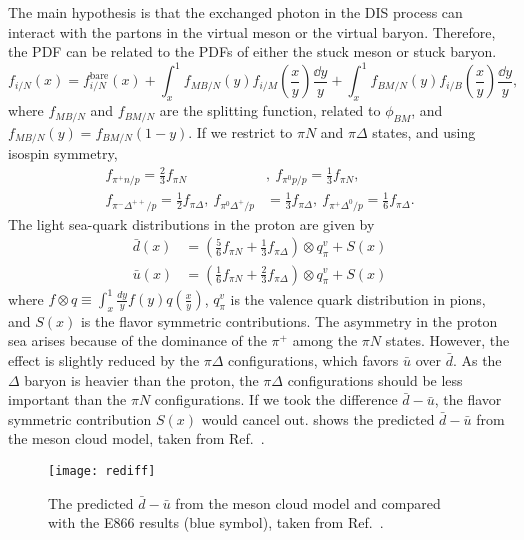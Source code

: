 \documentclass[../main.tex]{subfiles}
\begin{document}
The main hypothesis is that the exchanged photon in the DIS process can interact with the partons in the
virtual meson or the virtual
baryon. Therefore, the PDF can be related to the PDFs of either the stuck meson or stuck baryon.
\begin{equation}
	f_{i/N}\left(x\right) = f_{i/N}^{\mathrm{bare}}\left(x\right) +  \int^1_x f_{MB/N}\left(y\right) f_{i/M}\left(\frac{x}{y}\right) \frac{\dd{y}}{y} + \int^1_x f_{BM/N}\left(y\right) f_{i/B}\left(\frac{x}{y}\right) \frac{\dd{y}}{y},
\end{equation}
where $f_{MB/N}$ and $f_{BM/N}$ are the splitting function, related to $\phi_{BM}$, and $f_{MB/N}(y)=f_{BM/N}(1-y)$.
If we restrict to $\pi N$ and $\pi\Delta$ states, and using isospin symmetry,
\begin{align}
	f_{\pi^+n/p}=\frac{2}{3} f_{\pi N}                                       & , ~f_{\pi^0 p/p}=\frac{1}{3} f_{\pi N},                                         \\
	f_{\pi^-\Delta^{++}/p}=\frac{1}{2} f_{\pi \Delta}, ~f_{\pi^0 \Delta^+/p} & =\frac{1}{3} f_{\pi \Delta},  ~f_{\pi^+ \Delta^0/p}=\frac{1}{6} f_{\pi \Delta}.
\end{align}
The light sea-quark distributions in the proton are given by
\begin{align}
	\bar{d}(x) & = \left(\frac{5}{6}f_{\pi N} + \frac{1}{3}f_{\pi \Delta}\right)\otimes q^v_\pi + S(x) \\
	\bar{u}(x) & = \left(\frac{1}{6}f_{\pi N} + \frac{2}{3}f_{\pi \Delta}\right)\otimes q^v_\pi + S(x)
	\label{eq:pion_dbub}
\end{align}
where $f\otimes q\equiv \int^1_x \frac{dy}{y}f(y)q\left(\frac{x}{y}\right)$, $q^v_\pi$ is the valence
quark distribution in pions, and $S(x)$ is the flavor symmetric contributions.
The asymmetry in the proton sea arises because of the dominance of the $\pi^+$ among the $\pi N$ states.
However, the effect is slightly reduced by the $\pi\Delta$ configurations, which favors $\bar{u}$ over $\bar{d}$.
As the $\Delta$ baryon is heavier than the proton, the $\pi\Delta$ configurations should be less important than
the $\pi N$ configurations.
If we took the difference $\bar{d}-\bar{u}$, the flavor symmetric contribution $S(x)$ would cancel out.
shows the predicted $\bar{d}-\bar{u}$ from the meson cloud model, taken from Ref.~\cite{alberg2022}.
\begin{figure}
	\centering
	\texttt{[image: rediff]}
	\caption{The predicted $\bar{d}-\bar{u}$ from the meson cloud model and compared with the E866 results (blue symbol), taken from Ref.~\cite{alberg2022}.}
	\label{fig:pion_cloud}
\end{figure}
\end{document}
